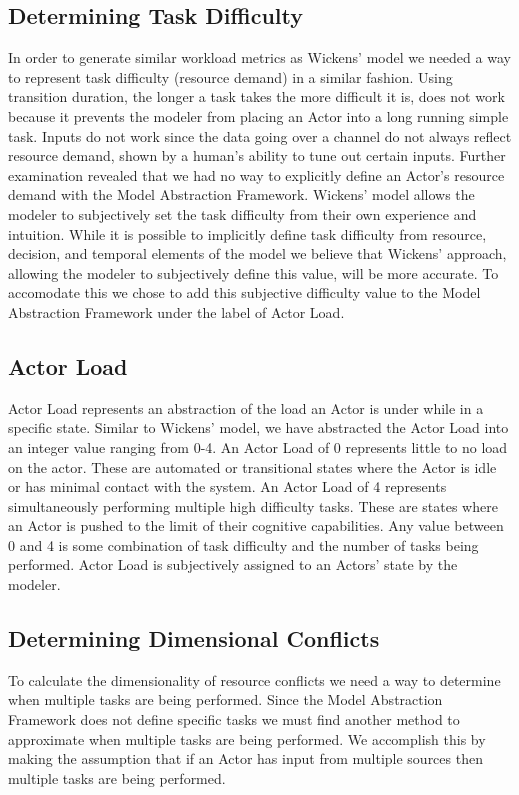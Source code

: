 \subsection{Determining Task Difficulty}
In order to generate similar workload metrics as Wickens' model we needed a way to represent task difficulty (resource demand) in a similar fashion.  Using transition duration, the longer a task takes the more difficult it is, does not work because it prevents the modeler from placing an Actor into a long running simple task.  Inputs do not work since the data going over a channel do not always reflect resource demand, shown by a human's ability to tune out certain inputs.  Further examination revealed that we had no way to explicitly define an Actor's resource demand with the Model Abstraction Framework.  Wickens' model allows the modeler to subjectively set the task difficulty from their own experience and intuition.  While it is possible to implicitly define task difficulty from resource, decision, and temporal elements of the model we believe that Wickens' approach, allowing the modeler to subjectively define this value, will be more accurate.  To accomodate this we chose to add this subjective difficulty value to the Model Abstraction Framework under the label of Actor Load.


	
\subsection{Actor Load}
Actor Load represents an abstraction of the load an Actor is under while in a specific state.  Similar to Wickens' model, we have abstracted the Actor Load into an integer value ranging from 0-4.  An Actor Load of 0 represents little to no load on the actor.  These are automated or transitional states where the Actor is idle or has minimal contact with the system.  An Actor Load of 4 represents simultaneously performing multiple high difficulty tasks.  These are states where an Actor is pushed to the limit of their cognitive capabilities. Any value between 0 and 4 is some combination of task difficulty and the number of tasks being performed.  Actor Load is subjectively assigned to an Actors' state by the modeler.

\subsection{Determining Dimensional Conflicts}
To calculate the dimensionality of resource conflicts we need a way to determine when multiple tasks are being performed.  Since the Model Abstraction Framework does not define specific tasks we must find another method to approximate when multiple tasks are being performed.  We accomplish this by making the assumption that if an Actor has input from multiple sources then multiple tasks are being performed.

